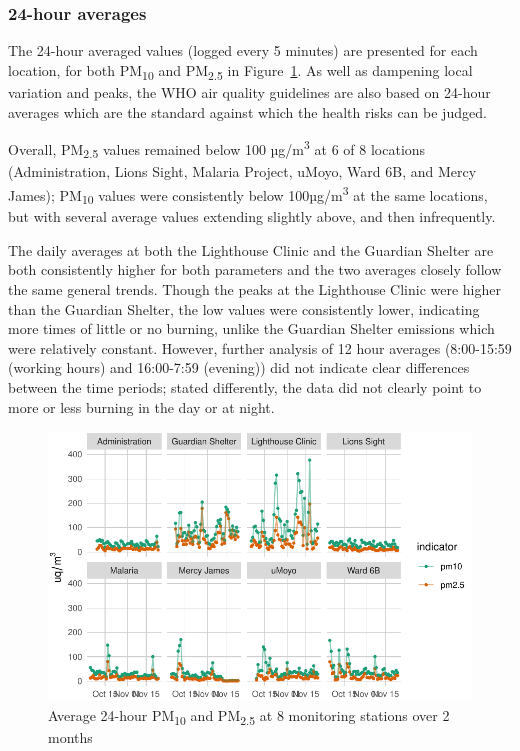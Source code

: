 \documentclass[
  authoryear,
  review,
  3p]{elsarticle}
\begin{document}
\hypertarget{hour-averages}{%
\subsubsection{24-hour averages}\label{hour-averages}}

The 24-hour averaged values (logged every 5 minutes) are presented for
each location, for both PM\textsubscript{10} and PM\textsubscript{2.5}
in Figure~\ref{fig-24-hour-average}. As well as dampening local
variation and peaks, the WHO air quality guidelines are also based on
24-hour averages which are the standard against which the health risks
can be judged.

Overall, PM\textsubscript{2.5} values remained below 100
µg/m\textsuperscript{3} at 6 of 8 locations (Administration, Lions
Sight, Malaria Project, uMoyo, Ward 6B, and Mercy James);
PM\textsubscript{10} values were consistently below
100µg/m\textsuperscript{3} at the same locations, but with several
average values extending slightly above, and then infrequently.

The daily averages at both the Lighthouse Clinic and the Guardian
Shelter are both consistently higher for both parameters and the two
averages closely follow the same general trends. Though the peaks at the
Lighthouse Clinic were higher than the Guardian Shelter, the low values
were consistently lower, indicating more times of little or no burning,
unlike the Guardian Shelter emissions which were relatively constant.
However, further analysis of 12 hour averages (8:00-15:59 (working
hours) and 16:00-7:59 (evening)) did not indicate clear differences
between the time periods; stated differently, the data did not clearly
point to more or less burning in the day or at night.

\begin{figure}

{\centering \includegraphics{manuscript-qech-air-quality-tilley_files/figure-pdf/fig-24-hour-average-1.pdf}

}

\caption{\label{fig-24-hour-average}Average 24-hour PM\textsubscript{10}
and PM\textsubscript{2.5} at 8 monitoring stations over 2 months}

\end{figure}
\end{document}
